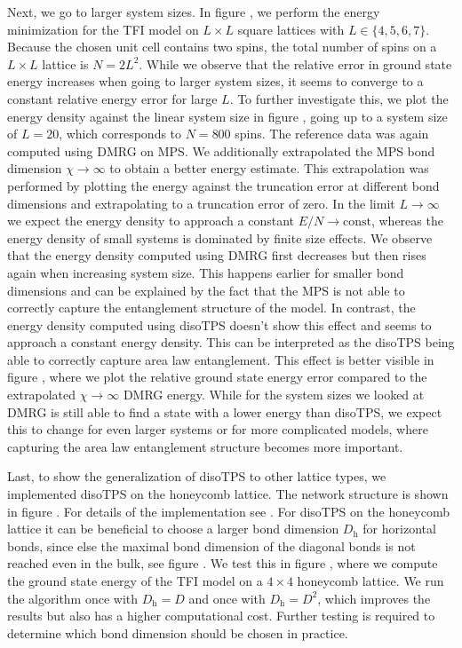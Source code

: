 Next, we go to larger system sizes. In figure , we perform the energy minimization for the TFI model on $L\times L$ square lattices with $L\in\{4,5,6,7\}$. Because the chosen unit cell contains two spins, the total number of spins on a $L\times L$ lattice is $N = 2L^2$. While we observe that the relative error in ground state energy increases when going to larger system sizes, it seems to converge to a constant relative energy error for large $L$. To further investigate this, we plot the energy density against the linear system size in figure , going up to a system size of $L = 20$, which corresponds to $N = 800$ spins. The reference data was again computed using DMRG on MPS. We additionally extrapolated the MPS bond dimension $\chi\rightarrow\infty$ to obtain a better energy estimate. This extrapolation was performed by plotting the energy against the truncation error at different bond dimensions and extrapolating to a truncation error of zero. In the limit $L\rightarrow\infty$ we expect the energy density to approach a constant $E/N\rightarrow \text{const}$, whereas the energy density of small systems is dominated by finite size effects. We observe that the energy density computed using DMRG first decreases but then rises again when increasing system size. This happens earlier for smaller bond dimensions and can be explained by the fact that the MPS is not able to correctly capture the entanglement structure of the model. In contrast, the energy density computed using disoTPS doesn't show this effect and seems to approach a constant energy density. This can be interpreted as the disoTPS being able to correctly capture area law entanglement. This effect is better visible in figure , where we plot the relative ground state energy error compared to the extrapolated $\chi\rightarrow\infty$ DMRG energy. While for the system sizes we looked at DMRG is still able to find a state with a lower energy than disoTPS, we expect this to change for even larger systems or for more complicated models, where capturing the area law entanglement structure becomes more important. \par

Last, to show the generalization of disoTPS to other lattice types, we implemented disoTPS on the honeycomb lattice. The network structure is shown in figure \figref{} . For details of the implementation see \cite{}. For disoTPS on the honeycomb lattice it can be beneficial to choose a larger bond dimension $D_\text{h}$ for horizontal bonds, since else the maximal bond dimension of the diagonal bonds is not reached even in the bulk, see figure \figref{}. We test this in figure , where we compute the ground state energy of the TFI model on a $4\times4$ honeycomb lattice. We run the algorithm once with $D_\text{h} = D$ and once with $D_\text{h} = D^2$, which improves the results but also has a higher computational cost. Further testing is required to determine which bond dimension should be chosen in practice.